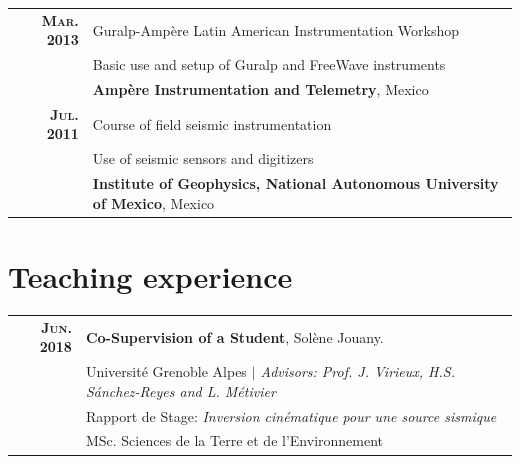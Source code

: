\documentclass[a4paper]{article} %
\begin{document}
\begin{tabular}{rl}	

{\bf \textsc{Mar.} 2013} & Guralp-Amp\`ere Latin American Instrumentation Workshop\\
& Basic use and setup of Guralp and FreeWave instruments\\
& \small\textbf{Amp\`ere Instrumentation and Telemetry}, Mexico\\[0.6em]

{\bf \textsc{Jul.} 2011} & Course of field seismic instrumentation\\
& Use of seismic sensors and digitizers\\
& \small\textbf{Institute of Geophysics, National Autonomous University of Mexico}, Mexico
\end{tabular}

\vskip 0.2cm
\section{Teaching experience}

\begin{tabular}{rl}	
{\bf \textsc{Jun. 2018}} & {\bf Co-Supervision of a Student}, Sol\`ene Jouany. \\
& \small{Universit\'e Grenoble Alpes} \emph{ $|$ \small Advisors: Prof. J. Virieux, H.S. S\'anchez-Reyes and L. M\'etivier} \\
& Rapport de Stage: \emph{Inversion cin\'ematique pour une source sismique} \\
& MSc. Sciences de la Terre et de l'Environnement
\end{tabular}


\vskip 0.2cm
\end{document}
